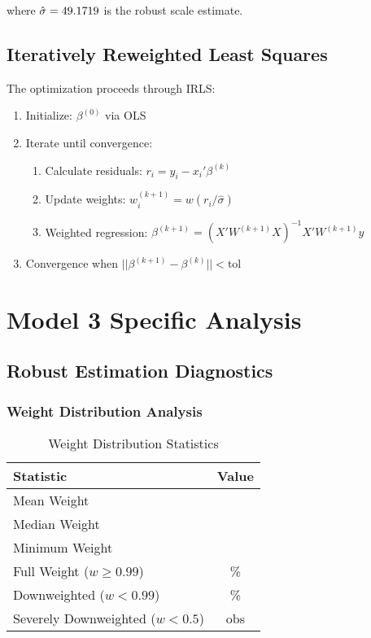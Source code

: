 where $\hat{\sigma} = 49.1719{}$ is the robust scale estimate.

\subsection{Iteratively Reweighted Least Squares}

The optimization proceeds through IRLS:
\begin{enumerate}
    \item Initialize: $\beta^{(0)}$ via OLS
    \item Iterate until convergence:
    \begin{enumerate}
        \item Calculate residuals: $r_i = y_i - x_i'\beta^{(k)}$
        \item Update weights: $w_i^{(k+1)} = w(r_i/\hat{\sigma})$
        \item Weighted regression: $\beta^{(k+1)} = (X'W^{(k+1)}X)^{-1}X'W^{(k+1)}y$
    \end{enumerate}
    \item Convergence when $||\beta^{(k+1)} - \beta^{(k)}|| < \text{tol}$
\end{enumerate}




\section{Model 3 Specific Analysis}

\subsection{Robust Estimation Diagnostics}

\subsubsection{Weight Distribution Analysis}

\begin{table}[ht]
\centering
\caption{Weight Distribution Statistics}
\begin{tabular}{lc}
\toprule
\textbf{Statistic} & \textbf{Value} \\
\midrule
Mean Weight & \ModelThreeMeanWeight{} \\
Median Weight & \ModelThreeMedianWeight{} \\
Minimum Weight & \ModelThreeMinWeight{} \\
Full Weight ($w \geq 0.99$) & \ModelThreeFullWeightPct{}\% \\
Downweighted ($w < 0.99$) & \ModelThreeOutlierPercentage{}\% \\
Severely Downweighted ($w < 0.5$) & \ModelThreeOutliersDetected{} obs \\
\bottomrule
\end{tabular}
\end{table}

